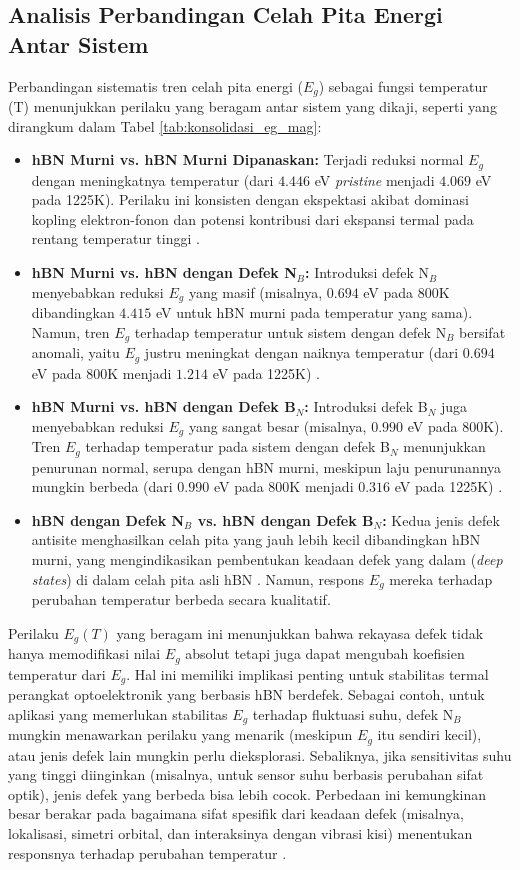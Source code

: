 \subsection{Analisis Perbandingan Celah Pita Energi Antar Sistem}
\label{subsec:perbandingan_eg}
Perbandingan sistematis tren celah pita energi ($E_g$) sebagai fungsi temperatur (T) menunjukkan perilaku yang beragam antar sistem yang dikaji, seperti yang dirangkum dalam Tabel \ref{tab:konsolidasi_eg_mag}:
\begin{itemize}
    \item \textbf{hBN Murni vs. hBN Murni Dipanaskan:} Terjadi reduksi normal $E_g$ dengan meningkatnya temperatur (dari $4.446$ eV \textit{pristine} menjadi $4.069$ eV pada 1225K). Perilaku ini konsisten dengan ekspektasi akibat dominasi kopling elektron-fonon dan potensi kontribusi dari ekspansi termal pada rentang temperatur tinggi \cite{[1]}.
    \item \textbf{hBN Murni vs. hBN dengan Defek N$_B$:} Introduksi defek N$_B$ menyebabkan reduksi $E_g$ yang masif (misalnya, $0.694$ eV pada 800K dibandingkan $4.415$ eV untuk hBN murni pada temperatur yang sama). Namun, tren $E_g$ terhadap temperatur untuk sistem dengan defek N$_B$ bersifat anomali, yaitu $E_g$ justru meningkat dengan naiknya temperatur (dari $0.694$ eV pada 800K menjadi $1.214$ eV pada 1225K) \cite{[1]}.
    \item \textbf{hBN Murni vs. hBN dengan Defek B$_N$:} Introduksi defek B$_N$ juga menyebabkan reduksi $E_g$ yang sangat besar (misalnya, $0.990$ eV pada 800K). Tren $E_g$ terhadap temperatur pada sistem dengan defek B$_N$ menunjukkan penurunan normal, serupa dengan hBN murni, meskipun laju penurunannya mungkin berbeda (dari $0.990$ eV pada 800K menjadi $0.316$ eV pada 1225K) \cite{[1]}.
    \item \textbf{hBN dengan Defek N$_B$ vs. hBN dengan Defek B$_N$:} Kedua jenis defek antisite menghasilkan celah pita yang jauh lebih kecil dibandingkan hBN murni, yang mengindikasikan pembentukan keadaan defek yang dalam (\textit{deep states}) di dalam celah pita asli hBN \cite{[1], Freysoldt2014}. Namun, respons $E_g$ mereka terhadap perubahan temperatur berbeda secara kualitatif.
\end{itemize}
Perilaku $E_g(T)$ yang beragam ini menunjukkan bahwa rekayasa defek tidak hanya memodifikasi nilai $E_g$ absolut tetapi juga dapat mengubah koefisien temperatur dari $E_g$. Hal ini memiliki implikasi penting untuk stabilitas termal perangkat optoelektronik yang berbasis hBN berdefek. Sebagai contoh, untuk aplikasi yang memerlukan stabilitas $E_g$ terhadap fluktuasi suhu, defek N$_B$ mungkin menawarkan perilaku yang menarik (meskipun $E_g$ itu sendiri kecil), atau jenis defek lain mungkin perlu dieksplorasi. Sebaliknya, jika sensitivitas suhu yang tinggi diinginkan (misalnya, untuk sensor suhu berbasis perubahan sifat optik), jenis defek yang berbeda bisa lebih cocok. Perbedaan ini kemungkinan besar berakar pada bagaimana sifat spesifik dari keadaan defek (misalnya, lokalisasi, simetri orbital, dan interaksinya dengan vibrasi kisi) menentukan responsnya terhadap perubahan temperatur \cite{[1]}.

